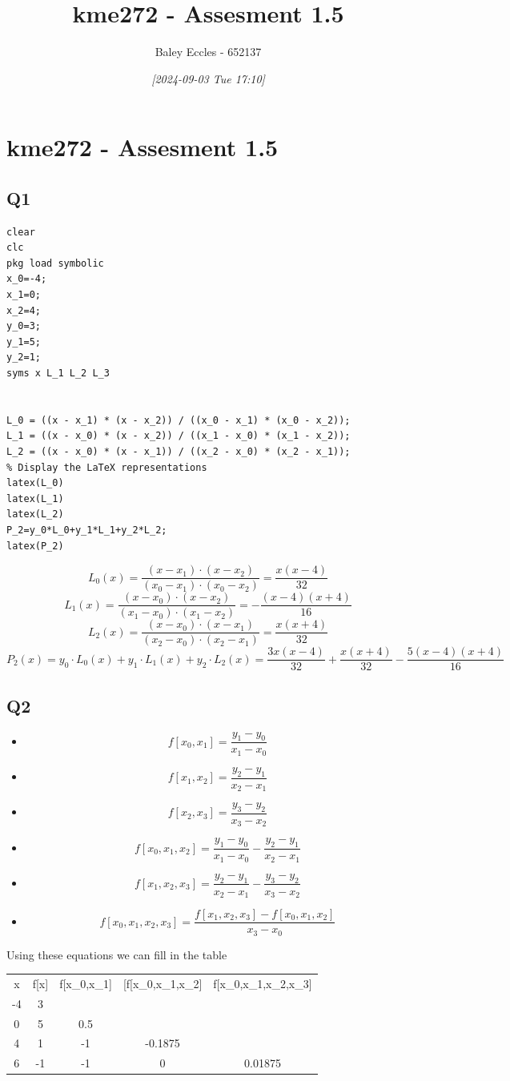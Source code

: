 \documentclass[11pt]{article}
\author{Baley Eccles - 652137}
\date{\textit{{[}2024-09-03 Tue 17:10]}}
\title{kme272 - Assesment 1.5}
\begin{document}
\maketitle
\tableofcontents

\section{kme272 - Assesment 1.5}
\label{sec:orge4f22a3}
\subsection{Q1}
\label{sec:org3bab8c5}


\begin{verbatim}
clear
clc
pkg load symbolic
x_0=-4;
x_1=0;
x_2=4;
y_0=3;
y_1=5;
y_2=1;
syms x L_1 L_2 L_3


L_0 = ((x - x_1) * (x - x_2)) / ((x_0 - x_1) * (x_0 - x_2));
L_1 = ((x - x_0) * (x - x_2)) / ((x_1 - x_0) * (x_1 - x_2));
L_2 = ((x - x_0) * (x - x_1)) / ((x_2 - x_0) * (x_2 - x_1));
% Display the LaTeX representations
latex(L_0)
latex(L_1)
latex(L_2)
P_2=y_0*L_0+y_1*L_1+y_2*L_2;
latex(P_2)
\end{verbatim}


\[L_0(x)=\frac{(x - x_1) \cdot (x - x_2)}{{}(x_0 - x_1) \cdot (x_0 - x_2)}=\frac{x \left(x - 4\right)}{32}\]
\[L_1(x)=\frac{(x - x_0) \cdot (x - x_2)}{{}(x_1 - x_0) \cdot (x_1 - x_2)}=-\frac{\left(x - 4\right) \left(x + 4\right)}{16}\]
\[L_2(x)=\frac{(x - x_0) \cdot (x - x_1)}{{}(x_2 - x_0) \cdot (x_2 - x_1)}=\frac{x \left(x + 4\right)}{32}\]
\[P_2(x)=y_0\cdot L_0(x) + y_1\cdot L_1(x) + y_2\cdot L_2(x) = \frac{3 x \left(x - 4\right)}{32} + \frac{x \left(x + 4\right)}{32} - \frac{5 \left(x - 4\right) \left(x + 4\right)}{16}\]
\subsection{Q2}
\label{sec:org55bfbbf}
\begin{itemize}
\item \[f[x_0,x_1]=\frac{y_1-y_0}{x_1-x_0}\]
\item \[f[x_1,x_2]=\frac{y_2-y_1}{x_2-x_1}\]
\item \[f[x_2,x_3]=\frac{y_3-y_2}{x_3-x_2}\]
\item \[f[x_0,x_1,x_2]=\frac{y_1-y_0}{x_1-x_0}-\frac{y_2-y_1}{x_2-x_1}\]
\item \[f[x_1,x_2,x_3]=\frac{y_2-y_1}{x_2-x_1}-\frac{y_3-y_2}{x_3-x_2}\]
\item \[f[x_0,x_1,x_2,x_3]=\frac{f[x_1,x_2,x_3]-f[x_0,x_1,x_2]}{x_3-x_0}\]
\end{itemize}
Using these equations we can fill in the table \\
\begin{tabular}{|c|c|c|c|c|}
x & f[x] & f[x_0,x_1] & [f[x_0,x_1,x_2] & f[x_0,x_1,x_2,x_3] \\
-4 & 3 &  &  & \\
0 & 5 & 0.5 &  & \\
4 & 1 & -1 & -0.1875 & \\
6 & -1 & -1 & 0 & 0.01875 \\
\end{tabular}
\end{document}

